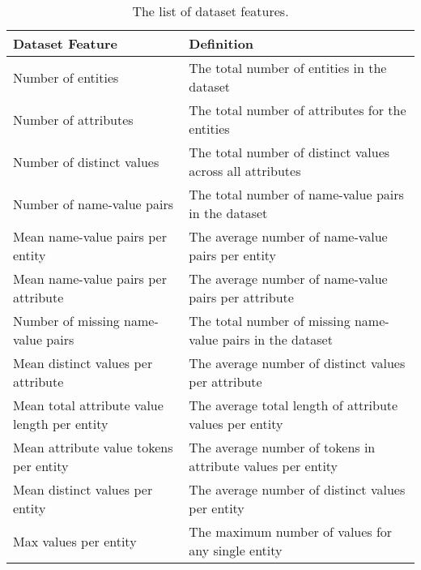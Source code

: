 \begin{table}[t]
{\footnotesize
\begin{center}  
\label{tab:featureSet}
\begin{tabular}{|p{2cm}|p{5cm}|}\hline
\textbf{Dataset Feature} & \textbf{Definition} \\
\hline
Number of entities & The total number of entities in the dataset \\ \hline
Number of attributes & The total number of attributes for the entities \\ \hline
Number of distinct values & The total number of distinct values across all attributes \\ \hline
Number of name-value pairs & The total number of name-value pairs in the dataset \\ \hline
Mean name-value pairs per entity & The average number of name-value pairs per entity \\ \hline
Mean name-value pairs per attribute & The average number of name-value pairs per attribute \\ \hline
Number of missing name-value pairs & The total number of missing name-value pairs in the dataset \\ \hline
Mean distinct values per attribute & The average number of distinct values per attribute \\ \hline
Mean total attribute value length per entity & The average total length of attribute values per entity \\ \hline
Mean attribute value tokens per entity & The average number of tokens in attribute values per entity \\ \hline
Mean distinct values per entity & The average number of distinct values per entity \\ \hline
Max values per entity & The maximum number of values for any single entity \\ \hline
\end{tabular}
\caption{The list of dataset features.}
\end{center}  
}
\end{table}